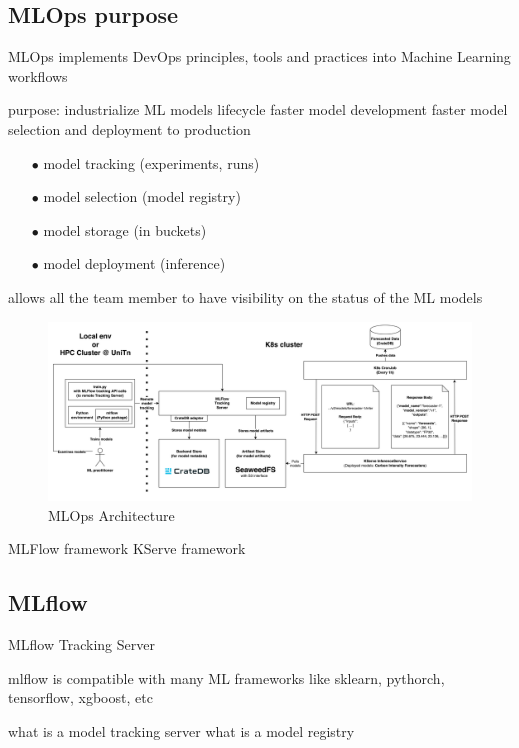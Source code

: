 \subsection{MLOps purpose}

MLOps implements DevOps principles, tools and practices into Machine Learning workflows 

purpose: industrialize ML models lifecycle
faster model development
faster model selection and deployment to production

\begin{itemize}[itemsep=0.2pt, topsep=1pt]
  \item[$\bullet$] model tracking (experiments, runs)
  \item[$\bullet$] model selection (model registry)
  \item[$\bullet$] model storage (in buckets)
  \item[$\bullet$] model deployment (inference)
\end{itemize}


allows all the team member to have visibility on the status of the ML models

\begin{figure}[htb]
\centering
\includegraphics[width=1\linewidth]{images/mlops_workflow.png}
\caption{MLOps Architecture}
\label{fig:mlops}
\end{figure}


MLFlow framework
KServe framework


\subsection{MLflow}



MLflow Tracking Server


mlflow is compatible with many ML frameworks like sklearn, pythorch, tensorflow, xgboost, etc


what is a model tracking server
what is a model registry



